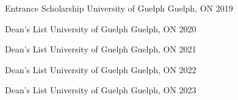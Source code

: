



\begin{cvhonors}

\cvhonor
{Entrance Scholarship} %
{University of Guelph} %
{Guelph, ON} %
{2019} %


\cvhonor
{Dean's List} %
{University of Guelph} %
{Guelph, ON} %
{2020} %


\cvhonor
{Dean's List} %
{University of Guelph} %
{Guelph, ON} %
{2021} %


\cvhonor
{Dean's List} %
{University of Guelph} %
{Guelph, ON} %
{2022} %


\cvhonor
{Dean's List} %
{University of Guelph} %
{Guelph, ON} %
{2023} %


\end{cvhonors}